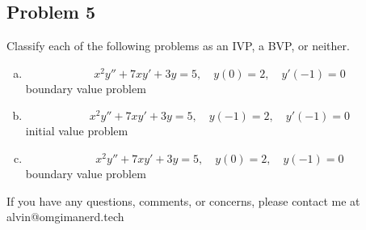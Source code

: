 \documentclass{math}
\begin{document}
\subsection*{Problem 5}
Classify each of the following problems as an IVP, a BVP, or neither.
\begin{enumerate}[(a)]
  \item \[ x^2y''+7xy'+3y = 5, \quad y(0) = 2, \quad y'(-1) = 0 \]
    boundary value problem
  \item \[ x^2y''+7xy'+3y = 5, \quad y(-1) = 2, \quad y'(-1) = 0 \]
    initial value problem
  \item \[ x^2y''+7xy'+3y = 5, \quad y(0) = 2, \quad y(-1) = 0 \]
    boundary value problem
\end{enumerate}

\begin{center}
  If you have any questions, comments, or concerns, please contact me at
  alvin@omgimanerd.tech
\end{center}
\end{document}
